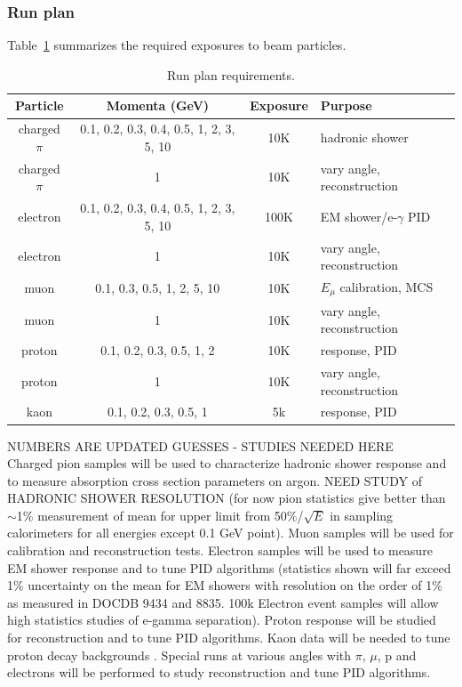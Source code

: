 \clearpage
\subsubsection {Run plan}

Table~\ref{tab:runplan} summarizes the required exposures to beam particles.
\begin{table}[h]
\centering
\begin{tabular}{|c|c|c|l|}
\hline
Particle & Momenta (GeV) & Exposure & Purpose \\ \hline
charged $\pi$       & 0.1, 0.2, 0.3, 0.4, 0.5, 1, 2, 3, 5, 10     &  10K  & hadronic shower \\ \hline
charged $\pi$ &  1  &  10K  & vary angle, reconstruction \\ \hline
electron       &    0.1, 0.2, 0.3, 0.4, 0.5, 1, 2, 3, 5, 10        &    100K   & EM shower/e-$\gamma$ PID     \\ \hline
electron &  1  &  10K  & vary angle, reconstruction \\ \hline
muon &   0.1, 0.3, 0.5, 1, 2, 5, 10  &  10K & $E_\mu$ calibration, MCS \\ \hline
muon &  1  &  10K  & vary angle, reconstruction \\ \hline
proton & 0.1, 0.2, 0.3, 0.5, 1, 2   &  10K & response, PID \\ \hline
proton &  1  &  10K & vary angle, reconstruction \\ \hline
kaon  & 0.1, 0.2, 0.3, 0.5, 1 & 5k   &   response, PID  \\ \hline
\end{tabular}
\caption{Run plan requirements.}
\label{tab:runplan}
\end{table}

NUMBERS ARE UPDATED GUESSES - STUDIES NEEDED HERE \\
Charged pion samples will be used to characterize hadronic shower response and to measure
absorption cross section parameters on argon. NEED STUDY of HADRONIC SHOWER RESOLUTION
(for now pion statistics give better than $\sim$1\% measurement of mean for upper limit from 50\%/$\sqrt{E}$ in sampling calorimeters
for all energies except 0.1 GeV point). 
Muon samples will be used for calibration and 
reconstruction tests. Electron samples will be used to measure EM shower response  
and to tune PID algorithms (statistics shown will far exceed 1\% uncertainty on the mean for 
EM showers with resolution on the order of 1\% as measured in DOCDB 9434 and 8835. 100k Electron event samples will allow
high statistics studies of e-gamma separation).  
Proton response will be studied for reconstruction and to tune PID 
algorithms. Kaon data will be needed to tune proton decay backgrounds .
Special runs at various angles with $\pi$, $\mu$, p and electrons will be performed to study reconstruction and tune PID algorithms. 

